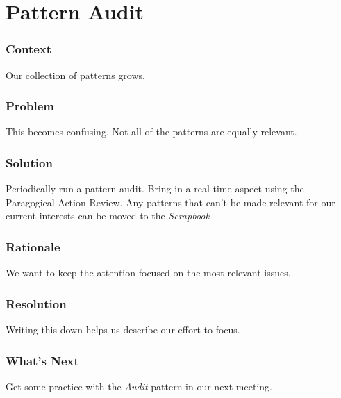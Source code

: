 \section{Pattern Audit}\label{sec:Pattern_Audit}

\subsubsection*{Context} Our collection of patterns grows.

\subsubsection*{Problem} This becomes confusing.  Not all of the patterns are equally relevant.

\subsubsection*{Solution} Periodically run a pattern audit.  Bring in a real-time aspect using the Paragogical Action Review.  Any patterns that can't be made relevant for our current interests can be moved to the \emph{Scrapbook}

\subsubsection*{Rationale} We want to keep the attention focused on the most relevant issues.

\subsubsection*{Resolution} Writing this down helps us describe our effort to focus.

\subsubsection*{What's Next} Get some practice with the \emph{Audit} pattern in our next meeting.
